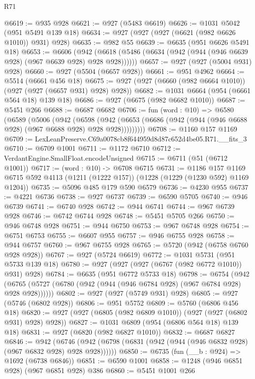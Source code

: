 \begin{lexlean}{R71}
\begin{coremodule}
@6619 := @935 @928
@6621 := @927 (@5483 @6619)
@6626 := @1031 @5042 (@951 @5491 @139 @18)
@6634 := @927 (@927 (@927 (@6621 (@982 @6626 @1010)) @931) @928)
@6635 := @982 @55
@6639 := @6635 (@951 @6626 @5491 @18)
@6653 := @6606
    (@942 (@6618 (@5486 (@6634 (@942 (@944 (@946 @6639 @928) (@967 @6639 @928) @928 @928))))))
@6657 := @927 (@927 (@5004 @931) @928)
@6660 := @927 (@5504 (@6657 @928))
@6661 := @951 @4962
@6664 := @5514 (@6661 @456 @18)
@6675 := @927 (@927 (@6660 (@982 @6664 @1010)) (@927 (@927 (@6657 @931) @928) @928))
@6682 := @1031 @6664 (@954 (@6661 @564 @18) @139 @18)
@6686 := @927 (@6675 (@982 @6682 @1010))
@6687 := @5451 @266
@6688 := @6687 @6682
@6706 := fun (word : @10) =>
  @6580
    (@6589
      (@5006
        (@942
          (@6598
            (@942 (@6653 (@6686 (@942 (@944 (@946 @6688 @928) (@967 @6688 @928) @928 @928)))))))))
@6708 := @1160 @157 @1169
@6709 := LexLeanPreserve.C69a0078cb8f644959d8d87c652d4be05.R71.__fits_3
@6710 := @6709 @1001
@6711 := @1172 @6710
@6712 := VerdantEngine.SmallFloat.encodeUnsigned
@6715 := @6711 (@51 (@6712 @1001))
@6717 := (word : @10) -> @6708 @6715
@6731 := @1186
    @157
    @1169
    @6715
    @592
    @4113
    (@1211 (@1222 @157))
    (@1228 (@1229 (@1230 @592) @1169 @1204))
@6735 := @5096 @485 @179 @590 @6579
@6736 := @4230 @955
@6737 := @4221 @6736
@6738 := @927 @6737
@6739 := @6590 @5705
@6740 := @946 @6739
@6741 := @6740 @928
@6742 := @944 @6741
@6744 := @967 @6739 @928
@6746 := @6742 @6744 @928
@6748 := @5451 @5705 @266
@6750 := @946 @6748 @928
@6751 := @944 @6750
@6753 := @967 @6748 @928
@6754 := @6751 @6753
@6755 := @6607 @955
@6757 := @946 @6755 @928
@6758 := @944 @6757
@6760 := @967 @6755 @928
@6765 := @5720 (@942 (@6758 @6760 @928 @928))
@6767 := @927 (@5724 @6619)
@6772 := @1031 @5731 (@951 @5733 @139 @18)
@6780 := @927 (@927 (@927 (@6767 (@982 @6772 @1010)) @931) @928)
@6784 := @6635 (@951 @6772 @5733 @18)
@6798 := @6754
    (@942 (@6765 (@5727 (@6780 (@942 (@944 (@946 @6784 @928) (@967 @6784 @928) @928 @928))))))
@6802 := @927 (@927 (@5749 @931) @928)
@6805 := @927 (@5746 (@6802 @928))
@6806 := @951 @5752
@6809 := @5760 (@6806 @456 @18)
@6820 := @927 (@927 (@6805 (@982 @6809 @1010)) (@927 (@927 (@6802 @931) @928) @928))
@6827 := @1031 @6809 (@954 (@6806 @564 @18) @139 @18)
@6831 := @927 (@6820 (@982 @6827 @1010))
@6832 := @6687 @6827
@6846 := @942
    (@6746 (@942 (@6798 (@6831 (@942 (@944 (@946 @6832 @928) (@967 @6832 @928) @928 @928))))))
@6850 := @6735 (fun (__b : @924) => @1692 (@6738 @6846))
@6851 := @6590 @1001
@6858 := @1248 (@946 @6851 @928) (@967 @6851 @928) @386
@6860 := @5451 @1001 @266

\end{coremodule}
\end{lexlean}
